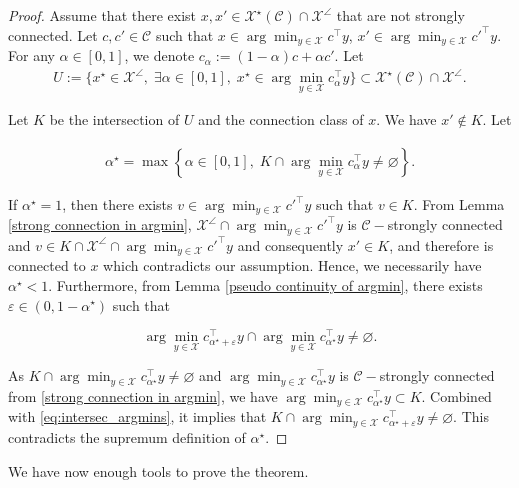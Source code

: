 \documentclass[11pt]{article}
\theoremstyle{plain}
\theoremstyle{definition}
\newcommand{\dualpoly}[2]{#1^\star\left(#2\right)}
\newcommand{\cX}{\mathcal{X}}
\newcommand{\cC}{\mathcal{C}}
\begin{document}
\begin{proof}
    Assume that there exist $x,x'\in  \dualpoly{\cX}{\cC}\cap \cX^\angle$ that are not strongly connected. Let $c,c'\in \cC$ such that $x\in \arg\min_{y\in \cX}c^\top y$, $x'\in \arg\min_{y\in \cX}c'^\top y$. For any $\alpha \in [0,1]$, we denote $c_\alpha:=(1-\alpha)c+\alpha c'$. Let 
    \begin{align*}
        U:=\{x^\star \in \cX^\angle,\; \exists \alpha\in[0,1],\; x^\star \in \arg\min_{y\in \cX}c_\alpha^\top y\}\subset \dualpoly{\cX}{\cC}\cap \cX^\angle.
    \end{align*}
    
    Let $K$ be the intersection of $U$ and the connection class of $x$. We have $x'\not\in K$. Let
    
    \begin{align*}
        \alpha^\star =\max\left\{\alpha \in [0,1],\;  K \cap \arg\min_{y\in \cX}c_\alpha^\top y \neq \varnothing\right\}.
    \end{align*}
    
    If $\alpha^\star=1$, then there exists $v\in \arg\min_{y\in \cX}c'^\top y$ such that $v\in K$. From Lemma \ref{strong connection in argmin}, $\cX^\angle \cap \arg\min_{y\in \cX}c'^\top y$ is $\cC-$strongly connected and $v\in K\cap \cX^\angle \cap \arg\min_{y\in \cX}c'^\top y$ and consequently $x'\in K$, and therefore is connected to $x$ which contradicts our assumption. Hence, we necessarily have $\alpha^\star<1$. 
    Furthermore, from Lemma \ref{pseudo continuity of argmin}, there exists $\varepsilon\in (0,1-\alpha^\star)$ such that 

    \begin{equation}\label{eq:intersec_argmins}
    \arg\min_{y\in \cX}c_{\alpha^\star + \varepsilon}^\top y \cap \arg\min_{y\in \cX}c_{\alpha^\star}^\top y \neq \varnothing.
    \end{equation}


    As $K\cap \arg\min_{y\in \cX}c_{\alpha^\star}^\top y \neq \varnothing$ and $\arg\min_{y\in \cX}c_{\alpha^\star}^\top y $ is $\cC-$strongly connected from \cref{strong connection in argmin}, we have $\arg\min_{y\in \cX}c_{\alpha^\star}^\top y \subset K$. Combined with \eqref{eq:intersec_argmins}, it implies that $K\cap \arg\min_{y\in \cX}c_{\alpha^\star+\varepsilon}^\top y \neq \varnothing$. This contradicts the supremum definition of $\alpha^\star$.
\end{proof}

We have now enough tools to prove the theorem.
\end{document}
